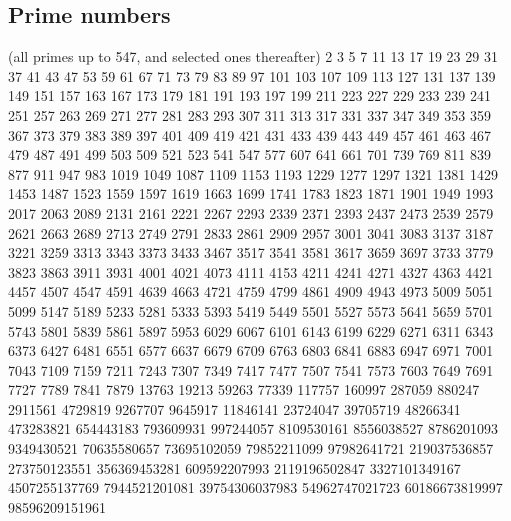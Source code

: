 \documentclass[letterpaper]{article}
\begin{document}
\subsection{Prime numbers}

(all primes up to 547, and selected ones thereafter) 2 3 5 7 11 13 17 19 23 29 31 37 41 43 47 53 59 61 67 71 73 79 83 89 97 101 103 107 109 113 127 131 137 139 149 151 157 163 167 173 179 181 191 193 197 199 211 223 227 229 233 239 241 251 257 263 269 271 277 281 283 293 307 311 313 317 331 337 347 349 353 359 367 373 379 383 389 397 401 409 419 421 431 433 439 443 449 457 461 463 467 479 487 491 499 503 509 521 523 541 547 577 607 641 661 701 739 769 811 839 877 911 947 983 1019 1049 1087 1109 1153 1193 1229 1277 1297 1321 1381 1429 1453 1487 1523 1559 1597 1619 1663 1699 1741 1783 1823 1871 1901 1949 1993 2017 2063 2089 2131 2161 2221 2267 2293 2339 2371 2393 2437 2473 2539 2579 2621 2663 2689 2713 2749 2791 2833 2861 2909 2957 3001 3041 3083 3137 3187 3221 3259 3313 3343 3373 3433 3467 3517 3541 3581 3617 3659 3697 3733 3779 3823 3863 3911 3931 4001 4021 4073 4111 4153 4211 4241 4271 4327 4363 4421 4457 4507 4547 4591 4639 4663 4721 4759 4799 4861 4909 4943 4973 5009 5051 5099 5147 5189 5233 5281 5333 5393 5419 5449 5501 5527 5573 5641 5659 5701 5743 5801 5839 5861 5897 5953 6029 6067 6101 6143 6199 6229 6271 6311 6343 6373 6427 6481 6551 6577 6637 6679 6709 6763 6803 6841 6883 6947 6971 7001 7043 7109 7159 7211 7243 7307 7349 7417 7477 7507 7541 7573 7603 7649 7691 7727 7789 7841 7879 13763 19213 59263 77339 117757 160997 287059 880247 2911561 4729819 9267707 9645917 11846141 23724047 39705719 48266341 473283821 654443183 793609931 997244057 8109530161 8556038527 8786201093 9349430521 70635580657 73695102059 79852211099 97982641721 219037536857 273750123551 356369453281 609592207993 2119196502847 3327101349167 4507255137769 7944521201081 39754306037983 54962747021723 60186673819997 98596209151961
\end{document}
